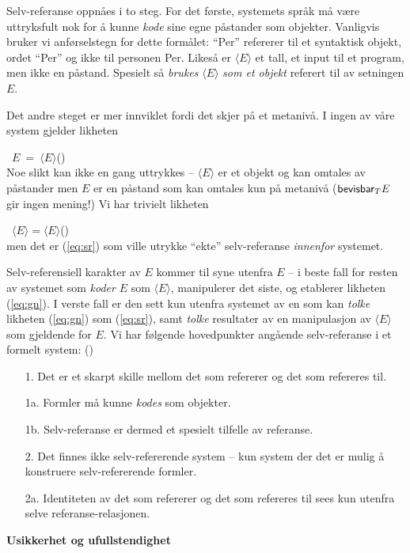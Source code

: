 \documentclass[10pt,twocolumn]{article}
\newcounter{EQ}
\newcommand{\equ}[1]{\refstepcounter{EQ}\vspace{.5ex}\par\noindent\ 
    \hfill #1\hfill{(\theEQ)}\\[.5ex]}
\newcommand{\refp}[1]{(\ref{#1})}
\newcommand{\<}{\langle}
\renewcommand{\>}{\rangle}
\newcommand{\MyLPar}{\parsep -.2ex plus.2ex minus.2ex\itemsep\parsep
   \vspace{-\topsep}\vspace{.5ex}}
\begin{document}
Selv-referanse oppn{\aa}es i to steg. For det 
f{\o}rste, systemets spr{\aa}k m{\aa} v{\ae}re uttryksfult nok for 
{\aa} kunne {\em kode} sine egne p{\aa}stander som objekter. 
Vanligvis bruker vi anf{\o}rselstegn for dette form{\aa}let:
``Per'' refererer til et syntaktisk objekt, ordet ``Per''
og ikke til personen Per. Likes{\aa} er $\<E\>$ et tall, et input 
til et program, men ikke en p{\aa}stand. Spesielt s{\aa} {\em brukes} 
$\<E\>$ {\em som et objekt} referert til av setningen $E$.

Det andre steget er mer innviklet fordi det skjer p{\aa} et 
metaniv{\aa}. I ingen av v{\aa}re system gjelder 
likheten
\equ{$E\ =\ \<E\>$}\label{eq:sr}
Noe slikt kan ikke en gang uttrykkes -- $\<E\>$ er et objekt og
kan omtales av  p{\aa}stander men  $E$ er en p{\aa}stand 
som kan omtales kun p{\aa} metaniv{\aa} (${\sf bevisbar}_{T}E$ 
gir ingen mening!) Vi har trivielt likheten 
\equ{$\<E\>=\<E\>$}\label{eq:gn}
men det er 
\refp{eq:sr} som ville utrykke ``ekte'' selv-referanse {\em innenfor} systemet.

Selv-referensiell karakter av $E$ kommer 
til syne utenfra $E$ -- i beste fall for resten av
systemet som {\em koder} $E$ som $\<E\>$, manipulerer det siste,
og etablerer likheten \refp{eq:gn}. I verste fall er den
sett kun  utenfra systemet av en som kan {\em 
tolke} likheten \refp{eq:gn} som \refp{eq:sr}, samt 
{\em tolke} resultater av en manipulasjon av $\<E\>$ som gjeldende for $E$.
Vi har f{\o}lgende hovedpunkter ang{\aa}ende 
selv-referanse i et formelt system: 
\hfill{(\theEQ)\label{no:sr}}
\begin{itemize}\MyLPar
\item[1.] Det er et skarpt skille mellom det som refererer 
og det som refereres til. 
\item[1a.] Formler m{\aa} kunne {\em kodes} som objekter.
\item[1b.] Selv-referanse er dermed et spesielt tilfelle av 
referanse. %
\item[2.] Det finnes ikke selv-refererende system -- kun system der 
 det er mulig {\aa} konstruere selv-refererende formler. 
\item[2a.] Identiteten av det som refererer og det som refereres til sees kun 
utenfra selve referanse-relasjonen.
\end{itemize}  
%
{\bf Usikkerhet og ufullstendighet}
\end{document}
